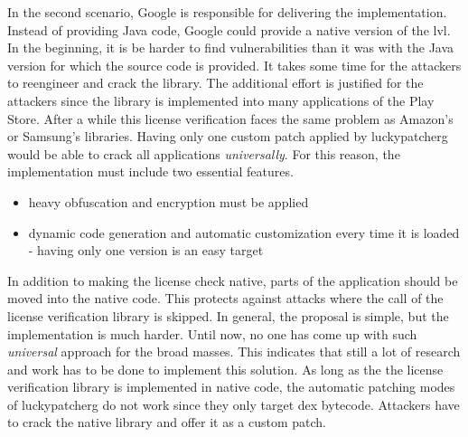 \newline
In the second scenario, Google is responsible for delivering the implementation.
Instead of providing Java code, Google could provide a native version of the \gls{lvl}.
In the beginning, it is be harder to find vulnerabilities than it was with the Java version for which the source code is provided.
It takes some time for the attackers to reengineer and crack the library.
The additional effort is justified for the attackers since the library is implemented into many applications of the Play Store.
After a while this license verification faces the same problem as Amazon's or Samsung's libraries.
Having only one custom patch applied by \gls{luckypatcherg} would be able to crack all applications \textit{universally}.
For this reason, the implementation must include two essential features.
\begin{itemize}
\item heavy obfuscation and encryption must be applied
\item dynamic code generation and automatic customization every time it is loaded - having only one version is an easy target
\end{itemize}
In addition to making the license check native, parts of the application should be moved into the native code.
This protects against attacks where the call of the license verification library is skipped.
\newline
\newline
In general, the proposal is simple, but the implementation is much harder.
Until now, no one has come up with such \textit{universal} approach for the broad masses.
This indicates that still a lot of research and work has to be done to implement this solution.
\newline
As long as the the license verification library is implemented in native code, the automatic patching modes of \gls{luckypatcherg} do not work since they only target dex bytecode.
Attackers have to crack the native library and offer it as a custom patch.
